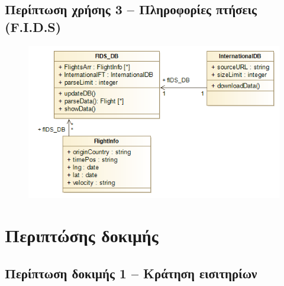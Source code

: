 \documentclass[12pt]{article}
\begin{document}
\subsection{Περίπτωση χρήσης 3 -- Πληροφορίες πτήσεις (F.I.D.S)}

\begin{figure}[H]
	\centering
	\includegraphics[width=\linewidth]{./res/UC3_Impl.png}
\end{figure}

\section{Περιπτώσης δοκιμής}

\subsection{Περίπτωση δοκιμής 1 -- Κράτηση εισιτηρίων}
\end{document}
